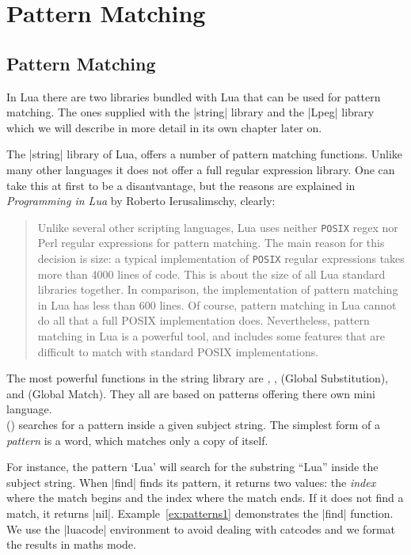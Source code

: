 \chapter{Pattern Matching}
\label{ch:patternmatching}

\section{Pattern Matching}

In Lua there are two libraries bundled with Lua that can be used for pattern matching. The ones supplied with the |string| library and the |Lpeg| library which we will describe in more detail in its own chapter later on.

The |string| library of Lua, offers a number of pattern matching functions. Unlike many other languages it does not offer a full regular expression library. One can take this at first to be a disantvantage, but the reasons are explained in \textit{Programming in Lua} by Roberto Ierusalimschy, clearly:

\begin{quotation}
Unlike several other scripting languages, Lua uses neither \texttt{POSIX} regex nor
Perl regular expressions for pattern matching. The main reason for this decision
is size: a typical implementation of \texttt{POSIX} regular expressions takes more than
4000 lines of code. This is about the size of all Lua standard libraries together.
In comparison, the implementation of pattern matching in Lua has less than
600 lines. Of course, pattern matching in Lua cannot do all that a full POSIX
implementation does. Nevertheless, pattern matching in Lua is a powerful tool,
and includes some features that are difficult to match with standard POSIX
implementations.
\end{quotation}

The  most powerful functions in the string library are , ,  (Global
Substitution), and  (Global Match). They all are based on patterns offering there own mini language.\\
()
searches for a pattern inside a given subject string. The simplest form of a \textit{pattern} is a word, which matches only a copy of itself.

For instance, the pattern ‘Lua’ will search for the substring “Lua” inside the
subject string. When |find| finds its pattern, it returns two values: the \textit{index} where the match begins and the index where the match ends. If it does not find a match, it returns |nil|. Example~\ref{ex:patterns1} demonstrates the |find| function. We use the |luacode| environment to avoid dealing with catcodes and we format the results in maths mode.

